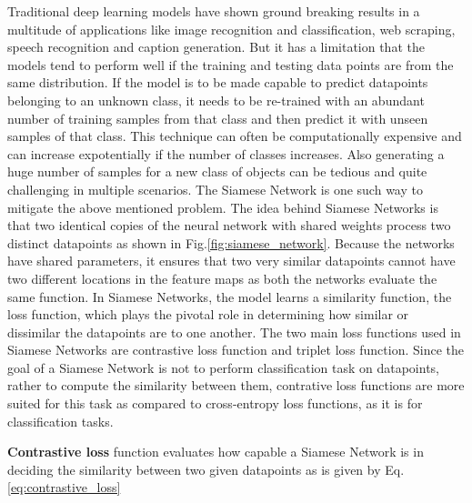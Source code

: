 Traditional deep learning models have shown ground breaking results in a multitude of applications like image recognition and classification, web scraping, speech recognition and caption generation. But it has a limitation that the models tend to perform well if the training and testing data points are from the same distribution. If the model is to be made capable to predict datapoints belonging to an unknown class, it needs to be re-trained with an abundant number of training samples from that class and then predict it with unseen samples of that class. This technique can often be computationally expensive and can increase expotentially if the number of classes increases. Also generating a huge number of samples for a new class of objects can be tedious and quite challenging in multiple scenarios. The Siamese Network\cite{koch2015siamese,bromley1993signature} is one such way to mitigate the above mentioned problem. The idea behind Siamese Networks is that two identical copies of the neural network with shared weights process two distinct datapoints as shown in Fig.\ref{fig:siamese_network}. Because the networks have shared parameters, it ensures that two very similar datapoints cannot have two different locations in the feature maps as both the networks evaluate the same function. In Siamese Networks, the model learns a similarity function, the loss function, which plays the pivotal role in determining how similar or dissimilar the datapoints are to one another. The two main loss functions used in Siamese Networks are contrastive loss function\cite{bromley1993signature} and triplet loss function\cite{balntas2016learning}. Since the goal of a Siamese Network is not to perform classification task on datapoints, rather to compute the similarity between them, contrative loss functions are more suited for this task as compared to cross-entropy loss functions, as it is for classification tasks.\cite{koch2015siamese}

\vspace{5mm}

\textbf{Contrastive loss} function evaluates how capable a Siamese Network is in deciding the similarity between two given datapoints as is given by Eq. \ref{eq:contrastive_loss}\cite{siamese_network, koch2015siamese}

